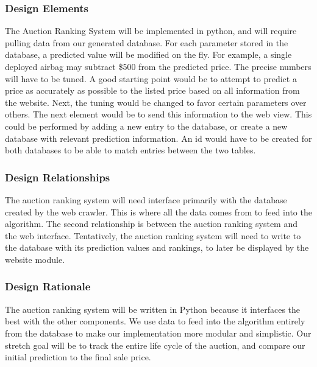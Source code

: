 \documentclass[onecolumn, draftclsnofoot, 10pt, compsoc]{IEEEtran}
\begin{document}
\subsubsection{Design Elements}
The Auction Ranking System will be implemented in python, and will require pulling data from our generated database. For each parameter stored in the database, a predicted value will be modified on the fly. For example, a single deployed airbag may subtract \$500 from the predicted price. The precise numbers will have to be tuned. A good starting point would be to attempt to predict a price as accurately as possible to the listed price based on all information from the website. Next, the tuning would be changed to favor certain parameters over others. The next element would be to send this information to the web view. This could be performed by adding a new entry to the database, or create a new database with relevant prediction information. An id would have to be created for both databases to be able to match entries between the two tables. 

\subsubsection{Design Relationships}
The auction ranking system will need interface primarily with the database created by the web crawler. This is where all the data comes from to feed into the algorithm. The second relationship is between the auction ranking system and the web interface. Tentatively, the auction ranking system will need to write to the database with its prediction values and rankings, to later be displayed by the website module. 

\subsubsection{Design Rationale}
The auction ranking system will be written in Python because it interfaces the best with the other components. We use data to feed into the algorithm entirely from the database to make our implementation more modular and simplistic. Our stretch goal will be to track the entire life cycle of the auction, and compare our initial prediction to the final sale price. 
\end{document}
